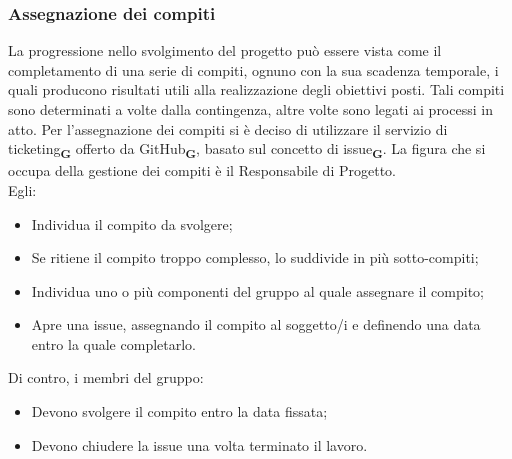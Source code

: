 \subsubsection{Assegnazione dei compiti}
La progressione nello svolgimento del progetto può essere vista come il completamento di una serie di compiti, ognuno con la sua scadenza temporale, i quali producono risultati utili alla realizzazione degli obiettivi posti. Tali compiti sono determinati a volte dalla contingenza, altre volte sono legati ai processi in atto. Per l’assegnazione dei compiti si è deciso di utilizzare il servizio di ticketing\textsubscript{\textbf{G}} offerto da GitHub\textsubscript{\textbf{G}}, basato sul concetto di issue\textsubscript{\textbf{G}}. La figura che si occupa della gestione dei compiti è il Responsabile di Progetto.\\
Egli:
\begin {itemize}
\item Individua il compito da svolgere;
\item Se ritiene il compito troppo complesso, lo suddivide in più sotto-compiti;
\item Individua uno o più componenti del gruppo al quale assegnare il compito;
\item Apre una issue, assegnando il compito al soggetto/i e definendo una data entro la quale completarlo.
\end {itemize}
Di contro, i membri del gruppo:
\begin {itemize}
\item Devono svolgere il compito entro la data fissata;
\item Devono chiudere la issue una volta terminato il lavoro.
\end {itemize}
